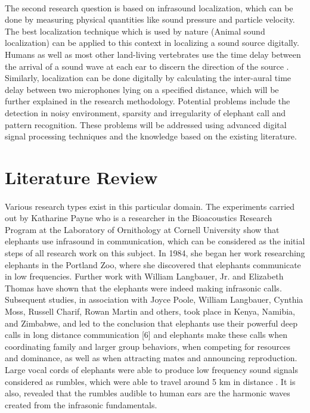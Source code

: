 \documentclass[11pt]{article}
\numberwithin{figure}{section}
\numberwithin{table}{section}
\begin{document}
\paragraph{}
The second research question is based on infrasound localization, which can be done by measuring physical quantities like sound pressure and particle velocity. The best localization technique which is used by nature (Animal sound localization) can be applied to this context in localizing a sound source digitally. Humans as well as most other land-living vertebrates use the time delay between the arrival of a sound wave at each ear to discern the direction of the source \cite {8}. Similarly, localization can be done digitally by calculating the inter-aural time delay  between two microphones lying on a specified distance, which will be further explained in the research methodology. Potential problems include the detection in noisy environment, sparsity and irregularity of elephant call and pattern recognition. These problems will be addressed using advanced digital signal processing techniques and the knowledge based on the existing literature.


\section{Literature Review}
\paragraph{}
Various research types exist in this particular domain. The experiments carried out by Katharine Payne who is a researcher in the Bioacoustics Research Program at the Laboratory of Ornithology at Cornell University show that elephants use infrasound in communication, which can be considered as the initial steps of all research work on this subject. In 1984, she began her work researching elephants in the Portland Zoo, where she discovered that elephants communicate in low frequencies. Further work with William Langbauer, Jr. and Elizabeth Thomas have shown that the elephants were indeed making infrasonic calls. Subsequent studies, in association with Joyce Poole, William Langbauer, Cynthia Moss, Russell Charif, Rowan Martin and others, took place in Kenya, Namibia, and Zimbabwe, and led to the conclusion that elephants use their powerful deep calls in long distance communication [6] and elephants make these calls when coordinating family and larger group behaviors, when competing for resources and dominance, as well as when attracting mates and announcing reproduction. Large vocal cords of elephants were able to produce low frequency sound signals considered as rumbles, which were able to travel around 5 km in distance \cite {6}. It is also, revealed that the rumbles audible to human ears are the harmonic waves created from the infrasonic fundamentals.
\end{document}
